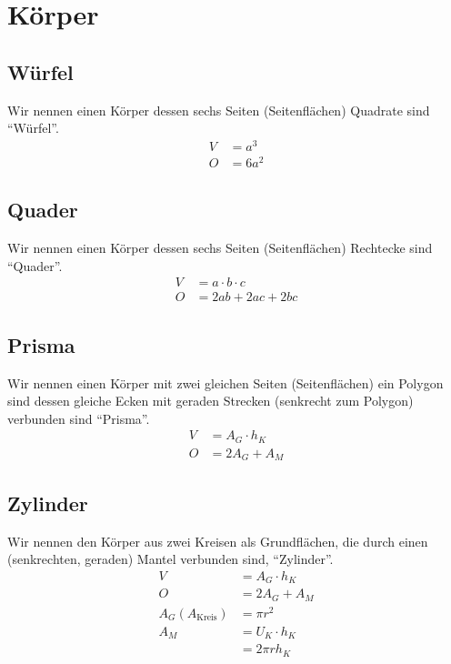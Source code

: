\documentclass[a4paper]{book}%
\theoremstyle{definition}
\begin{document}
\section{Körper}


\subsection{Würfel}

Wir nennen einen Körper dessen sechs Seiten (Seitenflächen) Quadrate sind \enquote{Würfel}.
\begin{align}\label{eqn:fsWuerfel}
  V &= a^3 \\
  O &= 6a^2
\end{align}


\subsection{Quader}

Wir nennen einen Körper dessen sechs Seiten (Seitenflächen) Rechtecke sind \enquote{Quader}.
\begin{align}\label{eqn:fsQuader}
  V &= a \cdot b \cdot c \\
  O &= 2ab + 2ac + 2bc
\end{align}


\subsection{Prisma}

Wir nennen einen Körper mit zwei gleichen Seiten (Seitenflächen) ein Polygon sind dessen gleiche Ecken mit geraden Strecken (senkrecht zum Polygon) verbunden sind \enquote{Prisma}.
\begin{align}\label{eqn:fsPrisma}
  V &= A_G \cdot h_K \\
  O &= 2 A_G + A_M
\end{align}


\subsection{Zylinder}

Wir nennen den Körper aus zwei Kreisen als Grundflächen, die durch einen (senkrechten, geraden) Mantel verbunden sind, \enquote{Zylinder}.
\begin{align}\label{eqn:fsZylinder}
  V &= A_G \cdot h_K \\
  O &= 2 A_G + A_M\\
  A_G (A_{\text{Kreis}}) &= \pi r^2\\
  A_M &= U_K \cdot h_K\\
    &= 2 \pi r h_K
\end{align}

\printindex
\printbibliography
\end{document}

